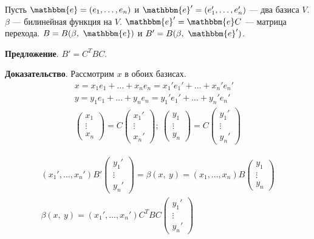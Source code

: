 \documentclass[a4paper, 12pt]{article}
\newcommand{\me}{\mathbbm{e}}
\begin{document}
\vspace{5mm}
Пусть $\me = (e_1, \ldots, e_n)$ и $\me' = (e_1', \ldots, e_n')$ --- два базиса $V$. $\beta$ --- билинейная функция на $V$. $\me' = \me C$ --- матрица перехода. $B = B(\beta,\ \me)$ и $B' = B(\beta,\ \me')$.

\textbf{Предложение}. $B' =  C^TBC$.

\textbf{Доказательство}. Рассмотрим $x$ в обоих базисах.
\vspace{-3mm}
\begin{gather*}
x = x_1e_1 + \ldots + x_ne_n = x_1'e_1' + \ldots + x_n'e_n' \\
y = y_1e_1 + \ldots + y_ne_n = y_1'e_1' + \ldots + y_n'e_n' \\
\begin{pmatrix}
x_1 \\
\vdots \\
x_n
\end{pmatrix} = C
\begin{pmatrix}
x_1' \\
\vdots \\
x_n'
\end{pmatrix};\ 
\begin{pmatrix}
y_1 \\
\vdots \\
y_n
\end{pmatrix} = C
\begin{pmatrix}
y_1' \\
\vdots \\
y_n'
\end{pmatrix}
\end{gather*}

\begin{gather*}
(x_1', \ldots, x_n')B'
\begin{pmatrix}
y_1' \\
\vdots \\
y_n'
\end{pmatrix} = \beta(x,\ y) = (x_1, \ldots, x_n)B
\begin{pmatrix}
y_1 \\
\vdots \\
y_n
\end{pmatrix} \\
\beta(x,\ y) = (x_1', \ldots, x_n') C^T B C
\begin{pmatrix}
y_1' \\
\vdots \\
y_n'
\end{pmatrix}
\end{gather*}
\end{document}
